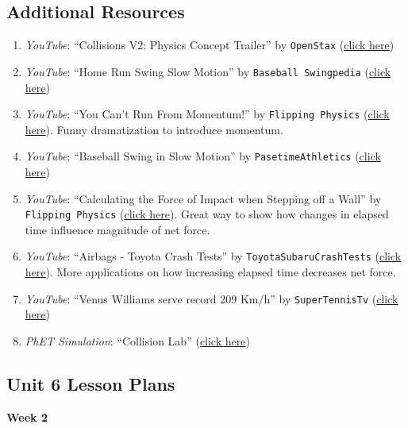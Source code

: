 \documentclass{article}
\numberwithin{equation}{section}
\numberwithin{figure}{section}
\begin{document}
\clearpage
\printnoidxglossaries

\clearpage
\subsection{Additional Resources}

\begin{enumerate}
\setlength\itemsep{0.1ex}
    \item \textit{YouTube}: ``Collisions V2: Physics Concept Trailer'' by \texttt{OpenStax} (\href{https://youtu.be/hxMaoFcYSrw}{click here})
    \item \textit{YouTube}: ``Home Run Swing Slow Motion'' by \texttt{Baseball Swingpedia} (\href{https://youtu.be/4cdbV6m_49U}{click here})
    \item \textit{YouTube}: ``You Can't Run From Momentum!'' by \texttt{Flipping Physics} (\href{https://youtu.be/K-lH-DoD6Tk}{click here}). Funny dramatization to introduce momentum. 
    \item \textit{YouTube}: ``Baseball Swing in Slow Motion'' by \texttt{PasetimeAthletics} (\href{https://youtu.be/jvY06zoY0M4}{click here})
    \item \textit{YouTube}: ``Calculating the Force of Impact when Stepping off a Wall'' by \texttt{Flipping Physics} (\href{https://youtu.be/ILIFo2X7EUY}{click here}). Great way to show how changes in elapsed time influence magnitude of net force.
    \item \textit{YouTube}: ``Airbags - Toyota Crash Tests'' by \texttt{ToyotaSubaruCrashTests} (\href{https://youtu.be/Bw0Ps8-KDlQ}{click here}). More applications on how increasing elapsed time decreases net force.
    \item \textit{YouTube}: ``Venus Williams serve record 209 Km/h'' by \texttt{SuperTennisTv} (\href{https://youtu.be/6b1NSgQZvdo}{click here})
    \item \textit{PhET Simulation}: ``Collision Lab'' (\href{https://phet.colorado.edu/en/simulations/collision-lab}{click here})
\end{enumerate}

\clearpage
\subsection*{Unit 6 Lesson Plans}

\textbf{Week 2}
\vspace{1ex}
\end{document}
